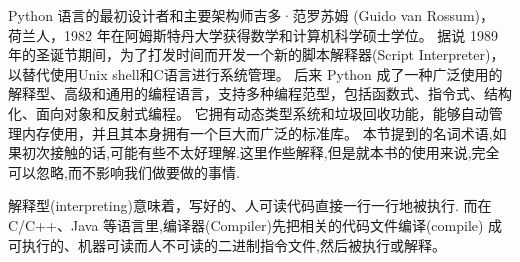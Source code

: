 \documentclass[main.tex]{subfiles}
\begin{document}
Python 语言的最初设计者和主要架构师吉多·范罗苏姆 (Guido van Rossum)， 荷兰人，1982 年在阿姆斯特丹大学获得数学和计算机科学硕士学位。
据说 1989 年的圣诞节期间，为了打发时间而开发一个新的脚本解释器(Script Interpreter)，以替代使用Unix shell和C语言进行系统管理。
后来 Python 成了一种广泛使用的解释型、高级和通用的编程语言，支持多种编程范型，包括函数式、指令式、结构化、面向对象和反射式编程。
它拥有动态类型系统和垃圾回收功能，能够自动管理内存使用，并且其本身拥有一个巨大而广泛的标准库。
本节提到的名词术语,如果初次接触的话,可能有些不太好理解.这里作些解释,但是就本书的使用来说,完全可以忽略,而不影响我们做要做的事情.

解释型(interpreting)意味着，写好的、人可读代码直接一行一行地被执行. 而在 C/C++、Java 等语言里,编译器(Compiler)先把相关的代码文件编译(compile)
成可执行的、机器可读而人不可读的二进制指令文件,然后被执行或解释。
\end{document}
